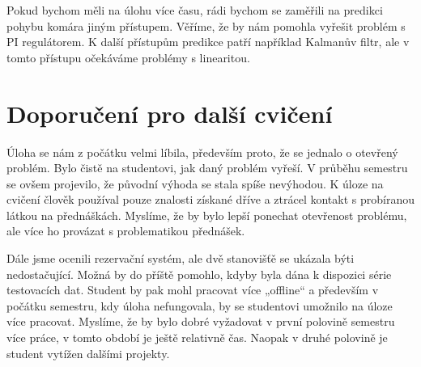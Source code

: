 \documentclass[a4paper,10pt]{article}
\begin{document}
Pokud bychom měli na úlohu více času, rádi bychom se zaměřili na predikci pohybu komára jiným přístupem.
Věříme, že by nám pomohla vyřešit problém s PI regulátorem.
K další přístupům predikce patří například Kalmanův filtr, 
ale v tomto přístupu očekáváme problémy s linearitou. 
 
\section*{Doporučení pro další cvičení}

Úloha se nám z počátku velmi líbila, především proto, že se jednalo o otevřený problém. 
Bylo čistě na studentovi, jak daný problém vyřeší. 
V průběhu semestru se ovšem projevilo, že původní výhoda se stala spíše nevýhodou. 
K úloze na cvičení člověk používal pouze znalosti získané dříve a ztrácel kontakt s probíranou látkou na přednáškách.
Myslíme, že by bylo lepší ponechat otevřenost problému, ale více ho provázat s problematikou přednášek.

Dále jsme ocenili rezervační systém, ale dvě stanovišťě se ukázala býti nedostačující. 
Možná by do příště pomohlo, kdyby byla dána k dispozici série testovacích dat. 
Student by pak mohl pracovat více „offline“ a především v počátku semestru, 
kdy úloha nefungovala, by se studentovi umožnilo na úloze více pracovat.
Myslíme, že by bylo dobré vyžadovat v první polovině semestru více práce, 
v tomto období je ještě relativně čas. 
Naopak v druhé polovině je student vytížen dalšími projekty.





\end{document}
